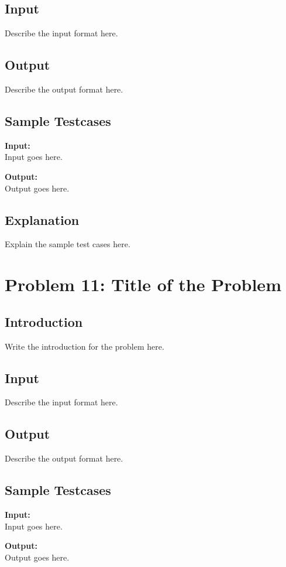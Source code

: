 \documentclass[12pt]{article}
\begin{document}
\subsection*{Input}
Describe the input format here.

\subsection*{Output}
Describe the output format here.

\subsection*{Sample Testcases}
\textbf{Input:} \\
Input goes here.

\textbf{Output:} \\
Output goes here.

\subsection*{Explanation}
Explain the sample test cases here.

\newpage

\section*{Problem 11: Title of the Problem}

\subsection*{Introduction}
Write the introduction for the problem here.

\subsection*{Input}
Describe the input format here.

\subsection*{Output}
Describe the output format here.

\subsection*{Sample Testcases}
\textbf{Input:} \\
Input goes here.

\textbf{Output:} \\
Output goes here.
\end{document}
